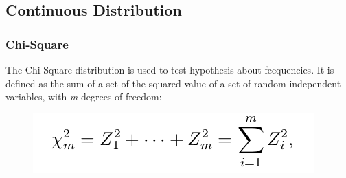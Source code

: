 \documentclass[]{article}
\begin{document}
\subsection{Continuous Distribution}\label{continuous-distribution}

\subsubsection{Chi-Square}\label{chi-square}

The Chi-Square distribution is used to test hypothesis about
feequencies. It is defined as the sum of a set of the squared value of a
set of random independent variables, with \emph{m} degrees of freedom:

\begin{figure}
\centering
\includegraphics{chiSquared.PNG}
\caption{}
\end{figure}
\end{document}
